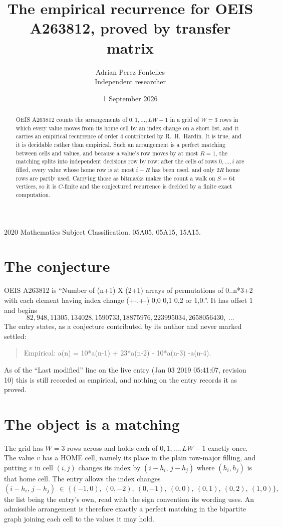 \documentclass[11pt,a4paper]{article}
\title{The empirical recurrence for OEIS A263812, proved by transfer matrix}
\author{Adrian Perez Fontelles\\ \small Independent researcher}
\date{1 September 2026}
\theoremstyle{plain}
\theoremstyle{definition}
\begin{document}
\maketitle

\begin{abstract}
OEIS A263812 counts the arrangements of $0,1,\dots,LW-1$ in a grid of $W=3$ rows in which
every value moves from its home cell by an index change on a short list, and it carries an
empirical recurrence of order $4$ contributed by R.~H.~Hardin. It is true, and it is
decidable rather than empirical. Such an arrangement is a perfect matching between cells and
values, and because a value's row moves by at most $R=1$, the matching splits into
independent decisions row by row: after the cells of rows $0,\dots,i$ are filled,
every value whose home row is at most $i-R$ has been used, and only $2R$ home rows are
partly used. Carrying those as bitmasks makes the count a walk on $S=64$ vertices, so it is
$C$-finite and the conjectured recurrence is decided by a finite exact computation.
\end{abstract}

\noindent\small 2020 Mathematics Subject Classification. 05A05, 05A15, 15A15.\normalsize

\section{The conjecture}

OEIS A263812 is ``Number of (n+1) X (2+1) arrays of permutations of 0..n*3+2 with each element having index change (+-,+-) 0,0 0,1 0,2 or 1,0.''. It has offset $1$ and begins
\[
82, 948, 11305, 134028, 1590733, 18875976, 223995034, 2658056430,\ \dots
\]
The entry states, as a conjecture contributed by its author and never marked settled:
\begin{quote}
Empirical: a(n) = 10*a(n-1) + 23*a(n-2) - 10*a(n-3) -a(n-4).
\end{quote}
As of the ``Last modified'' line on the live entry (Jan 03 2019 05:41:07, revision 10) this is still
recorded as empirical, and nothing on the entry records it as proved.

\section{The object is a matching}

The grid has $W=3$ rows across and holds each of $0,1,\dots,LW-1$ exactly once. The value
$v$ has a HOME cell, namely its place in the plain row-major filling, and putting $v$ in cell
$(i,j)$ changes its index by $(i-h_i,\,j-h_j)$ where $(h_i,h_j)$ is that home cell. The entry
allows the index changes
\[
(i-h_i,\,j-h_j)\;\in\;\{(-1,0),\ (0,-2),\ (0,-1),\ (0,0),\ (0,1),\ (0,2),\ (1,0)\},
\]
the list being the entry's own, read with the sign convention its wording uses. An admissible
arrangement is therefore exactly a perfect matching in the bipartite graph joining each cell to
the values it may hold.
\end{document}
